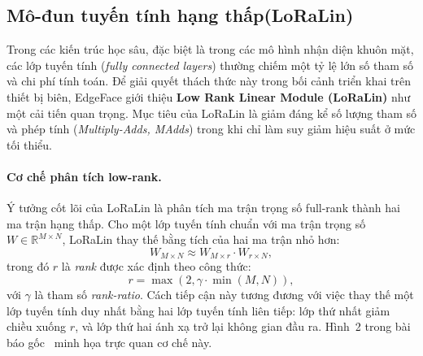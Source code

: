 





\subsection{Mô-đun tuyến tính hạng thấp(LoRaLin)}

 
Trong các kiến trúc học sâu, đặc biệt là trong các mô hình nhận diện khuôn mặt, các lớp tuyến tính (\textit{fully connected layers}) thường chiếm một tỷ lệ lớn số tham số và chi phí tính toán. Để giải quyết thách thức này trong bối cảnh triển khai trên thiết bị biên, EdgeFace giới thiệu \textbf{Low Rank Linear Module (LoRaLin)} như một cải tiến quan trọng. Mục tiêu của LoRaLin là giảm đáng kể số lượng tham số và phép tính (\textit{Multiply-Adds, MAdds}) trong khi chỉ làm suy giảm hiệu suất ở mức tối thiểu.

\paragraph{Cơ chế phân tích low-rank.} 
Ý tưởng cốt lõi của LoRaLin là phân tích ma trận trọng số full-rank thành hai ma trận hạng thấp. Cho một lớp tuyến tính chuẩn với ma trận trọng số $W \in \mathbb{R}^{M \times N}$, LoRaLin thay thế bằng tích của hai ma trận nhỏ hơn:
\[
    W_{M \times N} \approx W_{M \times r} \cdot W_{r \times N},
\]
trong đó $r$ là \textit{rank} được xác định theo công thức:
\[
    r = \max(2, \gamma \cdot \min(M,N)),
\]
với $\gamma$ là tham số \textit{rank-ratio}. Cách tiếp cận này tương đương với việc thay thế một lớp tuyến tính duy nhất bằng hai lớp tuyến tính liên tiếp: lớp thứ nhất giảm chiều xuống $r$, và lớp thứ hai ánh xạ trở lại không gian đầu ra. Hình~2 trong bài báo gốc~\cite{george2024edgeface} minh họa trực quan cơ chế này.\\

